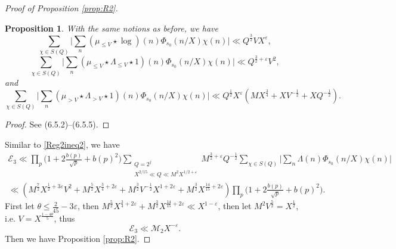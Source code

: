 \documentclass[12pt,reqno]{amsart}
\numberwithin{equation}{section}
\theoremstyle{plain}
\newtheorem{proposition}[theorem]{Proposition}
\theoremstyle{definition}
\theoremstyle{remark}
\begin{document}
\begin{proof}[Proof of Proposition \ref{prop:R2}]
\begin{proposition}\label{prop:regime3}
With the same notions as before, we have
\begin{equation*}\label{eqn:Baluyot_Pratt1}
    \sum_{\chi \in S(Q)}
    \Big|\sum_n (\mu_{\leq V}\star \log)(n) \Phi_{s_0}(n / X) \chi(n)\Big| \ll
    Q^{\frac{3}{2}}VX^{\varepsilon},
\end{equation*}
\begin{equation*}\label{eqn:Baluyot_Pratt2}
    \sum_{\chi \in S(Q)}
    \Big|\sum_n (\mu_{\leq V}\star \Lambda_{\leq V}\star 1)(n)
    \Phi_{s_0}(n / X) \chi(n)\Big| \ll
    Q^{\frac{3}{2}+\varepsilon}V^2,
\end{equation*}
and
\begin{equation*}\label{eqn:Baluyot_Pratt3}
    \sum_{\chi \in S(Q)}
    \Big|\sum_n (\mu_{> V}\star \Lambda_{> V}\star 1)(n)
    \Phi_{s_0}(n / X) \chi(n)\Big| \ll
    Q^{\frac{1}{2}}X^{\varepsilon}
    (MX^{\frac{3}{4}}+XV^{-\frac{1}{2}}
    +XQ^{-\frac{1}{2}}).
\end{equation*}
\end{proposition}
\begin{proof}
  See \cite{BP22} (6.5.2)--(6.5.5).
\end{proof}

Similar to \eqref{Reg2ineq2}, we have
\begin{multline*}
 \mathcal{E}_3\ll
 \prod_{p} \Big(1+2\frac{b(p)}{\sqrt{p}}+b(p)^2\Big)
 \sum_{\substack{Q=2^j \\ X^{2/15}\ll Q \ll M^2 X^{1 / 2+\varepsilon}}} M^{\frac{3}{2}+\varepsilon}Q^{-\frac{1}{2}}
 \sum_{\chi \in S(Q)}\Big|\sum_n \Lambda(n) \Phi_{s_0}(n / X) \chi(n)\Big|
 \\ \ll
\left(M^{\frac{7}{2}}X^{\frac{1}{2}+3\varepsilon} V^2
+ M^{\frac{5}{2}} X^{\frac{3}{4}+2\varepsilon}
+M^{\frac{3}{2}}V^{-\frac{1}{2}}X^{1+2\varepsilon}
+ M^{\frac{3}{2}} X^{\frac{14}{15}+2\varepsilon}\right)
\prod_{p} \Big(1+2\frac{b(p)}{\sqrt{p}}+b(p)^2\Big).
\end{multline*}
First let $\theta\leq \frac{2}{45}-3\varepsilon$, then $M^{\frac{5}{2}} X^{\frac{3}{4}+2\varepsilon}+M^{\frac{3}{2}} X^{\frac{14}{15}+2\varepsilon}\ll X^{1-\varepsilon}$, then let $M^2V^{\frac{5}{2}}=X^{\frac{1}{2}}$,
i.e. $V=X^{\frac{1-4\theta}{5}}$,
thus
\begin{equation*}
  \mathcal{E}_3\ll \mathcal{M}_2X^{-\varepsilon}.
\end{equation*}
Then we have Proposition \ref{prop:R2}.

\end{proof}
\end{document}
